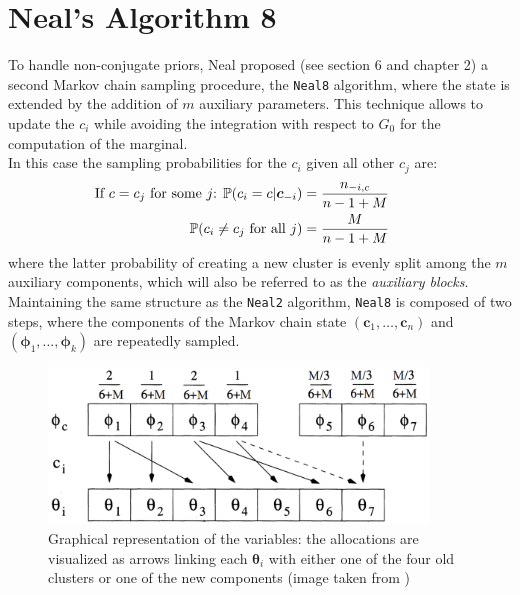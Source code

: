 \section{Neal's Algorithm 8} \label{neal8}
To handle non-conjugate priors, Neal proposed (see \cite{neal} section 6 and \cite{book} chapter 2) a second Markov chain sampling procedure, the \verb|Neal8| algorithm, where the state is extended by the addition of $m$ auxiliary parameters.
This technique allows to update the $c_i$ while avoiding the integration with respect to $G_0$ for the computation of the marginal. \\
In this case the sampling probabilities for the $c_i$ given all other $c_j$ are:
\begin{equation}
	\begin{aligned}
		\hspace{-25pt}
		\vspace{-12pt}
		\text{If $c=c_j$ for some $j$: } \PP(c_i=c | \boldsymbol c_{-i}) &= \frac{n_{-i,c}}{n-1+M}   \\
		\PP(c_{i}\neq c_{j} \text{ for all } j) &=\frac{M }{n-1+M}
	\end{aligned}	
\end{equation}
where the latter probability of creating a new cluster is evenly split among the $m$ auxiliary components, which will also be referred to as the \emph{auxiliary blocks}.
Maintaining the same structure as the \verb|Neal2| algorithm, \verb|Neal8| is composed of two steps, where the components of the Markov chain state $(\boldsymbol{c}_1,\dots,\boldsymbol{c}_n)$ and $(\boldsymbol{\phi}_1,\dots,\boldsymbol{\phi}_k)$ are repeatedly sampled.
\begin{figure}[h]
    \centering
    \includegraphics[width=0.9\textwidth]{etc/neal8.png}
    \captionsetup{labelformat=empty}
    \caption{Graphical representation of the variables: the allocations are visualized as arrows linking each $\boldsymbol\theta_i$ with either one of the four old clusters or one of the new components (image taken from \cite{neal})}
    \label{fig:neal8}
\end{figure}

